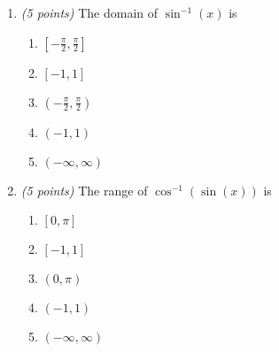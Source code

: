 \documentclass[fleqn]{article}
\begin{document}
\begin{enumerate}
\vspace{0.3in}


\item \textit{(5 points)} The domain of $\sin^{-1}(x)$ is
\begin{multicols}{3}
\begin{enumerate}
\item $[-\frac{\pi}{2}, \frac{\pi}{2}]$
\item $[-1, 1]$
\item $(-\frac{\pi}{2}, \frac{\pi}{2})$
\item $(-1, 1)$
\item $(-\infty, \infty)$
\end{enumerate}
\end{multicols}

\vspace{0.3in}

\item \textit{(5 points)} The range of $\cos^{-1}(\sin(x))$ is
\begin{multicols}{3}
\begin{enumerate}
\item $[0, \pi]$
\item $[-1, 1]$
\item $(0, \pi)$
\item $(-1, 1)$
\item $(-\infty, \infty)$
\end{enumerate}
\end{multicols}

\end{enumerate}
\end{document}
